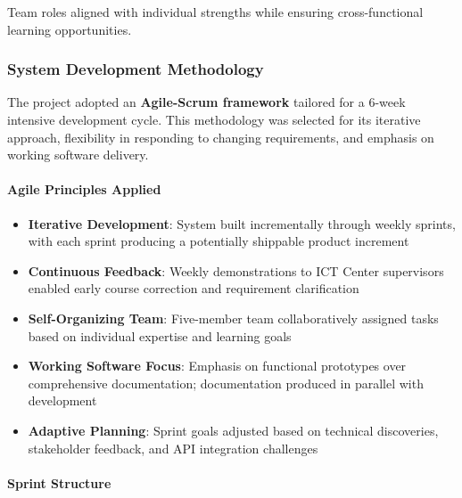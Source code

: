 \documentclass[12pt, a4paper]{article}
\begin{document}
Team roles aligned with individual strengths while ensuring cross-functional learning opportunities.

\subsubsection{System Development Methodology}

The project adopted an \textbf{Agile-Scrum framework} tailored for a 6-week intensive development cycle. This methodology was selected for its iterative approach, flexibility in responding to changing requirements, and emphasis on working software delivery.

\paragraph{Agile Principles Applied}

\begin{itemize}[leftmargin=1.5em, itemsep=3pt]
    \item \textbf{Iterative Development}: System built incrementally through weekly sprints, with each sprint producing a potentially shippable product increment
    
    \item \textbf{Continuous Feedback}: Weekly demonstrations to ICT Center supervisors enabled early course correction and requirement clarification
    
    \item \textbf{Self-Organizing Team}: Five-member team collaboratively assigned tasks based on individual expertise and learning goals
    
    \item \textbf{Working Software Focus}: Emphasis on functional prototypes over comprehensive documentation; documentation produced in parallel with development
    
    \item \textbf{Adaptive Planning}: Sprint goals adjusted based on technical discoveries, stakeholder feedback, and API integration challenges
\end{itemize}

\paragraph{Sprint Structure}
\end{document}

